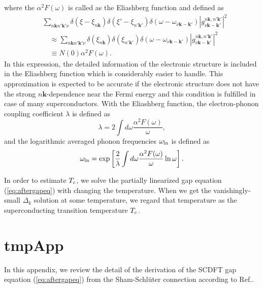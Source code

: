 %
where the $\alpha^2F(\omega)$ is called as the Eliashberg function and defined as
%
\begin{equation}
	\begin{split}
	& \sum_{n\bm k n'\bm k' \nu} \delta(\xi-\xi_{n\bm k})\delta(\xi'-\xi_{n'\bm k'})
	\delta(\omega-\omega_{\nu\bm k - \bm k'})|g^{n\bm k,n'\bm k'}_{\nu \bm k - \bm k'}|^2 \\
	&\quad \approx \sum_{n\bm k n'\bm k' \nu} \delta(\xi_{n\bm k})\delta(\xi_{n'\bm k'})
	\delta(\omega-\omega_{\nu\bm k - \bm k'}) |g^{n\bm k,n'\bm k'}_{\nu \bm k - \bm k'}|^2 \\
 	&\quad \equiv N(0)\alpha^2F(\omega).
	\label{eq:a2F}
\end{split}
\end{equation}
%
In this expression, the detailed information of the electronic structure is included in the
Eliashberg function which is considerably easier to handle.
This approximation is expected to be accurate if the electronic structure does not have the
strong $n\bm k$-dependence near the Fermi energy and this condition is fulfilled in case of 
many superconductors.
With the Eliashberg function, the electron-phonon coupling coefficient $\lambda$ is defined as
%
\begin{equation}
	\lambda = 2\int d\omega \frac{\alpha^2F(\omega)}{\omega},
	\label{eq:elphlambda}
\end{equation}
%
and the logarithmic averaged phonon frequencies $\omega_{\rm ln}$ is defined as
%
\begin{equation}
	\omega_{\rm ln} = \exp\left[ \frac{2}{\lambda}\int d\omega \frac{\alpha^2F(\omega)}{\omega}\ln \omega \right].
	\label{eq:omegaln}
\end{equation}
%

In order to estimate $T_{\rm c}$, we solve the partially linearized gap equation (\ref{eq:aftergapeq}) with changing 
the temperature. When we get the vanishingly-small $\Delta_{k}$ solution at some temperature, 
we regard that temperature as the superconducting transition temperature $T_{\rm c}$.
%
%

\section{tmpApp}
In this appendix, we review the detail of the derivation of the SCDFT gap equation
(\ref{eq:aftergapeq}) from the Sham-Schl\"{u}ter connection according to Ref.\cite{MarquesphD}.


